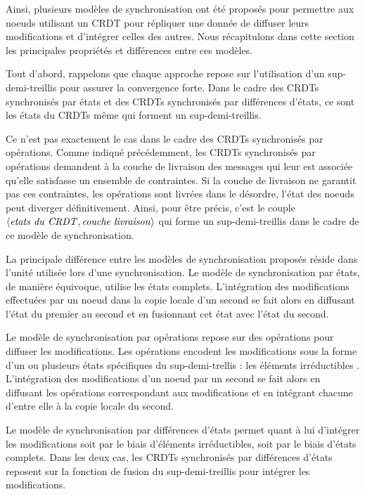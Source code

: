 \label{def:synchro-synthese}

Ainsi, plusieurs modèles de synchronisation ont été proposés pour permettre aux noeuds utilisant un \ac{CRDT} pour répliquer une donnée de diffuser leurs modifications et d'intégrer celles des autres.
Nous récapitulons dans cette section les principales propriétés et différences entre ces modèles.

Tout d'abord, rappelons que chaque approche repose sur l'utilisation d'un sup-demi-treillis pour assurer la convergence forte.
Dans le cadre des \acp{CRDT} synchronisés par états et des \acp{CRDT} synchronisés par différences d'états, ce sont les états du \acp{CRDT} même qui forment un sup-demi-treillis.

Ce n'est pas exactement le cas dans le cadre des \acp{CRDT} synchronisés par opérations.
Comme indiqué précédemment, les \acp{CRDT} synchronisés par opérations demandent à la couche de livraison des messages qui leur est associée qu'elle satisfasse un ensemble de contraintes.
Si la couche de livraison ne garantit pas ces contraintes, \eg les opérations sont livrées dans le désordre, l'état des noeuds peut diverger définitivement.
Ainsi, pour être précis, c'est le couple $\langle \mathit{etats~du~CRDT},\mathit{couche~livraison} \rangle$ qui forme un sup-demi-treillis dans le cadre de ce modèle de synchronisation.

La principale différence entre les modèles de synchronisation proposés réside dans l'unité utilisée lors d'une synchronisation.
Le modèle de synchronisation par états, de manière équivoque, utilise les états complets.
L'intégration des modifications effectuées par un noeud dans la copie locale d'un second se fait alors en diffusant l'état du premier au second et en fusionnant cet état avec l'état du second.

Le modèle de synchronisation par opérations repose sur des opérations pour diffuser les modifications.
Les opérations encodent les modifications sous la forme  d'un ou plusieurs états spécifiques du sup-demi-trellis : les éléments irréductibles .
L'intégration des modifications d'un noeud par un second se fait alors en diffusant les opérations correspondant aux modifications et en intégrant chacune d'entre elle à la copie locale du second.

Le modèle de synchronisation par différences d'états permet quant à lui d'intégrer les modifications soit par le biais d'éléments irréductibles, soit par le biais d'états complets.
Dans les deux cas, les \acp{CRDT} synchronisés par différences d'états reposent sur la fonction de fusion du sup-demi-treillis pour intégrer les modifications.

